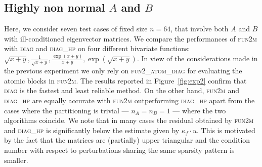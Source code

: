 \documentclass{siamart1116}
\begin{document}
\subsection{Highly non normal $A$ and $B$}
Here, we consider seven test cases of fixed size $n=64$, that involve both $A$ and $B$ with ill-conditioned eigenvector matrices. We compare the performances of \textsc{fun2m} with \textsc{diag} and \textsc{diag\_hp} on four different bivariate functions: $\sqrt{x+y}, \frac{1}{\sqrt{x+y}}, \frac{\exp(x+y)}{x+y}, \exp(\sqrt{x+y})$. In view of the considerations made in the previous experiment we only rely on \textsc{fun2\_atom\_diag} for evaluating the atomic blocks  in \textsc{fun2m}.  The results reported in Figure~\ref{fig:exp2} confirm that \textsc{diag} is the fastest and least reliable method. On the other hand, \textsc{fun2m} and \textsc{diag\_hp} are equally accurate with \textsc{fun2m} outperforming \textsc{diag\_hp} apart from  the cases where the partitioning is trivial --- $n_A=n_B=1$ --- where the two algorithms coincide.
We note that in many cases the residual obtained by \textsc{fun2m} and \textsc{diag\_hp} is significantly below the estimate given by $\kappa_f\cdot u$. This is motivated by the fact that the matrices are (partially) upper triangular and the condition number with respect to perturbations sharing the same sparsity pattern is smaller.  
\end{document}
